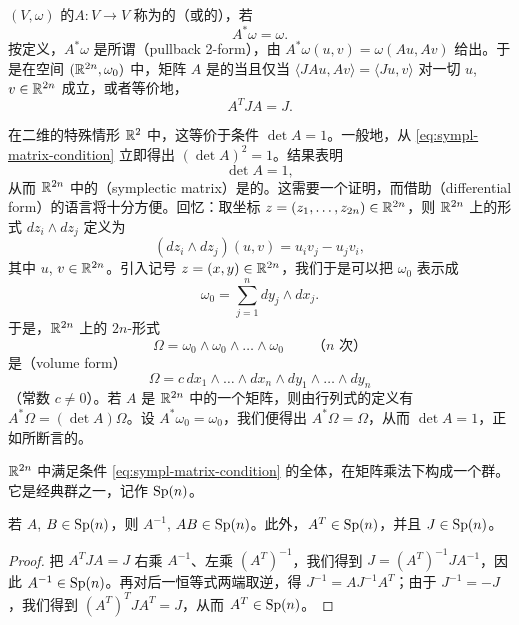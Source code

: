 \begin{definition}\label{def:symplectic-linear-map}
\trSymplecticVectorSpace{} $(V,\omega)$ 的\trLinear\trMapping $A:V\to V$ 称为\trSymplectic{}的（或\trCanonical{}的），若
\[
A^{*}\omega=\omega.
\]
按定义，$A^{*}\omega$ 是所谓\textbf{\trPullback\trTwoForm}（pullback 2-form），由 $A^{*}\omega(u,v)=\omega(Au,Av)$ 给出。于是在\trStandard{}空间 $(\mathbb{R}^{2n},\omega_0)$ 中，矩阵 $A$ 是\trSymplectic{}的当且仅当 $\langle JAu,Av\rangle=\langle Ju,v\rangle$ 对一切 $u$, $v\in\mathbb{R}^{2n}$ 成立，或者等价地，
\begin{equation}\label{eq:sympl-matrix-condition}
A^{T}JA=J.
\end{equation}
\end{definition}

在二维的特殊情形 $\mathbb{R}^{2}$ 中，这等价于条件 $\det A=1$。一般地，从 \eqref{eq:sympl-matrix-condition} 立即得出 $(\det A)^{2}=1$。结果表明
\begin{equation}\label{eq:det-one}
\det A=1,
\end{equation}
从而 $\mathbb{R}^{2n}$ 中的\textbf{\trSymplecticMatrix}（symplectic matrix）是\trVolumePreserving{}的。这需要一个证明，而借助\textbf{\trDifferentialForm}（differential form）的语言将十分方便。回忆：取坐标 $z=(z_1,\dots,z_{2n})\in\mathbb{R}^{2n}$，则 $\mathbb{R}^{2n}$ 上的\trBilinear{}形式 $dz_i\wedge dz_j$ 定义为
\[
(dz_i\wedge dz_j)(u,v)=u_i v_j-u_j v_i,
\]
其中 $u$, $v\in\mathbb{R}^{2n}$。引入记号 $z=(x,y)\in\mathbb{R}^{2n}$，我们于是可以把 $\omega_0$ 表示成
\[
\omega_0=\sum_{j=1}^{n} dy_j\wedge dx_j.
\]
于是，$\mathbb{R}^{2n}$ 上的 $2n$-形式
\[
\Omega=\omega_0\wedge\omega_0\wedge\dots\wedge\omega_0 \qquad\text{（$n$ 次）}
\]
是\textbf{\trVolumeForm}（volume form）
\[
\Omega=c\,dx_1\wedge\dots\wedge dx_n\wedge dy_1\wedge\dots\wedge dy_n
\]
（常数 $c\neq0$）。若 $A$ 是 $\mathbb{R}^{2n}$ 中的一个矩阵，则由行列式的定义有 $A^{*}\Omega=(\det A)\Omega$。设 $A^{*}\omega_0=\omega_0$，我们便得出 $A^{*}\Omega=\Omega$，从而 $\det A=1$，正如所断言的。

$\mathbb{R}^{2n}$ 中满足条件 \eqref{eq:sympl-matrix-condition} 的\trSymplecticMatrix{}全体，在矩阵乘法下构成一个群。它是经典\trLie{}群之一，记作 $\operatorname{Sp}(n)$。

\begin{proposition}\label{prop:spn-group-closure}
若 $A$, $B\in\operatorname{Sp}(n)$，则 $A^{-1}$, $AB\in\operatorname{Sp}(n)$。此外，$A^{T}\in\operatorname{Sp}(n)$，并且 $J\in\operatorname{Sp}(n)$。
\end{proposition}
\begin{proof}
把 $A^{T}JA=J$ 右乘 $A^{-1}$、左乘 $(A^{T})^{-1}$，我们得到 $J=(A^{T})^{-1}JA^{-1}$，因此 $A^{-1}\in\operatorname{Sp}(n)$。再对后一恒等式两端取逆，得 $J^{-1}=AJ^{-1}A^{T}$；由于 $J^{-1}=-J$，我们得到 $(A^{T})^{T}JA^{T}=J$，从而 $A^{T}\in\operatorname{Sp}(n)$。
\end{proof}

